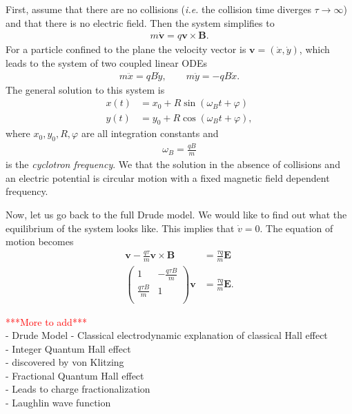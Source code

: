         First, assume that there are no collisions (\textit{i.e.} the collision time diverges $\tau \rightarrow\infty$) and that there is no electric field. Then the system simplifies to
        \begin{align}
            m\dot{\bm{v}} =q \bm{v}\times \bm{B}.
        \end{align}
        For a particle confined to the plane the velocity vector is $\bm{v} = (\dot{x}, \dot{y})$, which leads to the system of two coupled linear ODEs
        \begin{align}
            m \ddot{x} = q B \dot{y}, \qquad m \ddot{y}= -q B \dot{x}.
        \end{align}
        The general solution to this system is
        \begin{align}
            x(t) &= x_0 + R \sin\left(\omega_Bt + \varphi \right) \\
            y(t) &= y_0 + R \cos\left(\omega_Bt + \varphi \right),
        \end{align}
        where $x_0, y_0, R, \varphi$ are all integration constants and
        \begin{align}
            \omega_B = \frac{q B}{m}
        \end{align}
        is the \textit{cyclotron frequency}.
        We that the solution in the absence of collisions and an electric potential is circular motion with a fixed magnetic field dependent frequency.

        Now, let us go back to the full Drude model. We would like to find out what the equilibrium of the system looks like. This implies that $\dot{v} =0$. The equation of motion becomes 
        \begin{align}
            \bm{v} - \frac{q \tau}{m}\bm{v}\times\bm{B}  &=\frac{\tau q}{m} \bm{E} \\
            \begin{pmatrix}
                1 & -\frac{q \tau B}{m} \\
                \frac{q \tau B}{m} & 1 \\
            \end{pmatrix} \bm{v} &= \frac{\tau q}{m} \bm{E}.
        \end{align}

\textcolor{red}{***More to add***}\\
        - Drude Model
        - Classical electrodynamic explanation of classical Hall effect\\
        - Integer Quantum Hall effect \\
   \indent         - discovered by von Klitzing\\
        - Fractional Quantum Hall effect\\
    \indent        - Leads to charge fractionalization\\
           \indent - Laughlin wave function
